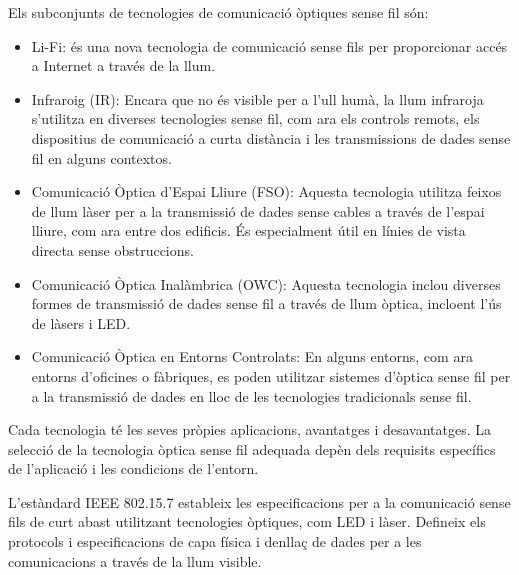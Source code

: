 Els subconjunts de tecnologies de comunicació òptiques sense fil són:
\begin{itemize}
    \item Li-Fi: és una nova tecnologia de comunicació sense fils per proporcionar accés a Internet a través de la llum.
    \item Infraroig (IR): Encara que no és visible per a l'ull humà, la llum infraroja s'utilitza en diverses tecnologies sense fil, com ara els controls remots, els dispositius de comunicació a curta distància i les transmissions de dades sense fil en alguns contextos.
    \item Comunicació Òptica d'Espai Lliure (FSO): Aquesta tecnologia utilitza feixos de llum làser per a la transmissió de dades sense cables a través de l'espai lliure, com ara entre dos edificis. És especialment útil en línies de vista directa sense obstruccions.
    \item Comunicació Òptica Inalàmbrica (OWC): Aquesta tecnologia inclou diverses formes de transmissió de dades sense fil a través de llum òptica, incloent l'ús de làsers i LED.
    \item Comunicació Òptica en Entorns Controlats: En alguns entorns, com ara entorns d'oficines o fàbriques, es poden utilitzar sistemes d'òptica sense fil per a la transmissió de dades en lloc de les tecnologies tradicionals sense fil.
\end{itemize}

Cada tecnologia té les seves pròpies aplicacions, avantatges i desavantatges. La selecció de la tecnologia òptica sense fil adequada depèn dels requisits específics de l'aplicació i les condicions de l'entorn.

L'estàndard IEEE 802.15.7 estableix les especificacions per a la comunicació sense fils de curt abast utilitzant tecnologies òptiques, com LED i làser. Defineix els protocols i especificacions de capa física i denllaç de dades per a les comunicacions a través de la llum visible.